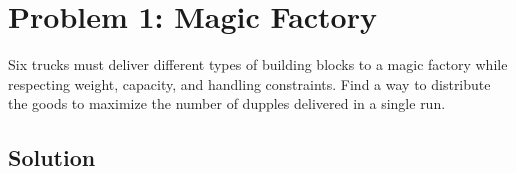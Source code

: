 \newcommand{\Dupples}{\texttt{Dupples}}
\newcommand{\Nuzzles}{\texttt{Nuzzles}}
\newcommand{\Prittles}{\texttt{Prittles}}
\newcommand{\Skipples}{\texttt{Skipples}}
\newcommand{\Crottles}{\texttt{Crottles}}

\section{Problem 1: Magic Factory}
Six trucks must deliver different types of building blocks to a magic factory while respecting weight, capacity, and handling constraints.
Find a way to distribute the goods to maximize the number of dupples delivered in a single run.


    	



    \subsection{Solution}

